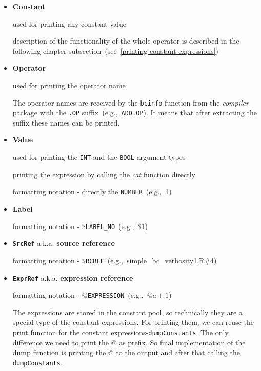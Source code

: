 \documentclass[thesis=M,english]{FITthesis}[2018/10/20]
\newcommand{\code}[1]{\texttt{#1}}
\begin{document}
\begin{itemize}
	\item \textbf{Constant}

		used for printing any constant value

		description of the functionality of the whole operator is described in the following chapter subsection~(see~\ref{printing-constant-expressions})

	\item \textbf{Operator}

		used for printing the operator name

		The operator names are received by the \code{bcinfo} function from the \textit{compiler} package with the \code{.OP} suffix~(e.g.,~\code{ADD.OP}). It means that after extracting the suffix these names can be printed.

	\item \textbf{Value}

		used for printing the \code{INT} and the \code{BOOL} argument types

		printing the expression by calling the \textit{cat} function directly

		formatting notation - directly the \code{NUMBER}~(e.g.,~1)

	\item \textbf{Label}

		formatting notation - \$\code{LABEL{\_}NO}~(e.g.,~\$1)

	\item \textbf{\code{SrcRef}} a.k.a. \textbf{source reference}

		formatting notation - \code{SRCREF}~(e.g.,~simple{\_}bc{\_}verbosity1.R{\#}4)

	\item \textbf{\code{ExprRef}} a.k.a. \textbf{expression reference}

		formatting notation - $@$\code{EXPRESSION}~(e.g.,~$@a+1$)

		The expressions are stored in the constant pool, so technically they are a special type of the constant expressions. For printing them, we can reuse the print function for the constant expressions-\code{dumpConstants}. The only difference we need to print the \code{$@$} as prefix. So final implementation of the dump function is printing the $@$ to the output and after that calling the \code{dumpConstants}.

\end{itemize}

\end{document}
